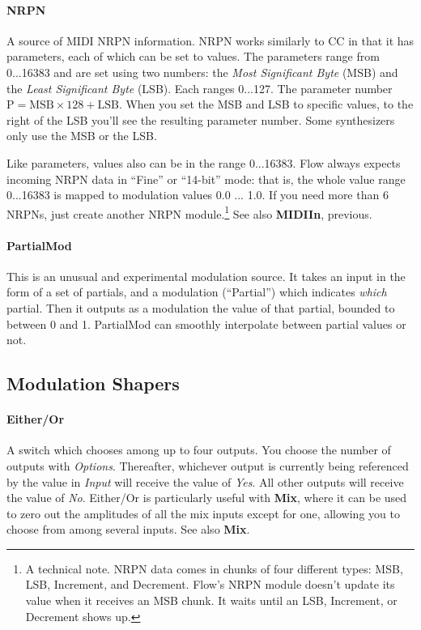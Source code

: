 \documentclass{article}
\newcommand\name{Flow}
\begin{document}
\paragraph{NRPN}  A source of MIDI NRPN information.  NRPN works similarly to CC in that it has parameters, each of which can be set to values.  The parameters range from 0...16383 and are set using two numbers: the {\it Most Significant Byte} (MSB) and the {\it Least Significant Byte} (LSB).  Each ranges 0...127.  The parameter number \(\text{P} = \text{MSB} \times 128 + \text{LSB}\).  When you set the MSB and LSB to specific values, to the right of the LSB you'll see the resulting parameter number.  Some synthesizers only use the MSB or the LSB.  

Like parameters, values also can be in the range 0...16383.  {\name} always expects incoming NRPN data in ``Fine'' or ``14-bit'' mode: that is, the whole value range 0...16383 is mapped to modulation values 0.0 ... 1.0.  If you need more than 6 NRPNs, just create another NRPN module.\footnote{A technical note.  NRPN data comes in chunks of four different types: MSB, LSB, Increment, and Decrement.  Flow's NRPN module doesn't update its value when it receives an MSB chunk.  It waits until an LSB, Increment, or Decrement shows up.}  See also {\bf MIDIIn}, previous.

\paragraph{PartialMod}  This is an unusual and experimental modulation source.  It takes an input in the form of a set of partials, and a modulation (``Partial'') which indicates {\it which} partial.  Then it outputs as a modulation the value of that partial, bounded to between 0 and 1.  PartialMod can smoothly interpolate between partial values or not.




\subsection{Modulation Shapers}

\paragraph{Either/Or}  A switch which chooses among up to four outputs.  You choose the number of outputs with {\it Options}.  Thereafter, whichever output is currently being referenced by the value in {\it Input} will receive the value of {\it Yes}.  All other outputs will receive the value of {\it No}.  Either/Or is particularly useful with {\bf Mix}, where it can be used to zero out the amplitudes of all the mix inputs except for one, allowing you to choose from among several inputs.  See also {\bf Mix}.
\end{document}
